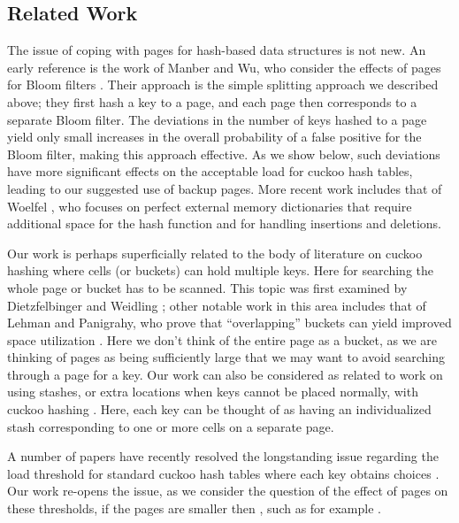 \let\accentvec\vec \documentclass{llncs}
\begin{document}
\subsection{Related Work}
The issue of coping with pages for hash-based data structures is not
new.  An early reference is the work of Manber and Wu, who consider
the effects of pages for Bloom filters
\cite{manber1994algorithm}. Their approach is the simple splitting approach we
described above; they first hash a key to a page, and each page then
corresponds to a separate Bloom filter.  The deviations in the number
of keys hashed to a page yield only small increases in the overall
probability of a false positive for the Bloom filter, making this
approach effective.  As we show below, such deviations
have more significant effects on the acceptable load for cuckoo
hash tables, leading to our suggested use of backup pages.  More recent
work includes that of Woelfel \cite{woelfel2006maintaining}, who
focuses on perfect external memory dictionaries that require
additional space for the hash function and for handling insertions and
deletions.

Our work is perhaps superficially related to the body of literature on
cuckoo hashing where cells (or buckets) can hold multiple keys. 
Here for searching the whole page or bucket has to be scanned.
This topic was first examined by Dietzfelbinger and Weidling
\cite{dietzfelbinger2007balanced}; other notable work in this area
includes that of Lehman and Panigrahy, who prove that ``overlapping''
buckets can yield improved space utilization \cite{LehmanP2009}.  Here
we don't think of the entire page as a bucket, as we are thinking of
pages as being sufficiently large that we may want to avoid searching
through a page for a key.  Our work can also be considered as related
to work on using stashes, or extra locations when keys cannot be
placed normally, with cuckoo hashing \cite{kirsch2008more}.  Here,
each key can be thought of as having an individualized stash corresponding
to one or more cells on a separate page.

A number of papers have recently resolved the longstanding issue regarding the load
threshold for standard cuckoo hash tables where each key obtains 
choices
\cite{dietzfelbinger2010tight,fountoulakis2011multiple,fountoulakis2010orientability,frieze2009maximum,GaoWormald2010}.
Our work re-opens the issue, as we consider the question of the effect
of pages on these thresholds, if the pages are smaller then
, such as for example .
\end{document}
